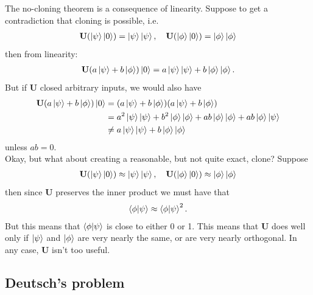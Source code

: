 \documentclass{book}
\theoremstyle{definition}
\newcommand{\nn}{\nonumber}
\begin{document}
The no-cloning theorem is a consequence of linearity. Suppose to get a contradiction that cloning is possible, i.e. 
\begin{align}
\mathbf{U}(\ket{\psi}\ket{0}) = \ket{\psi}\ket{\psi}, \quad \mathbf{U}(\ket{\phi}\ket{0}) = \ket{\phi}\ket{\phi}
\end{align}
then from linearity:
\begin{align}
\mathbf{U}(a\ket{\psi} + b\ket{\phi})\ket{0} = a\ket{\psi}\ket{\psi} + b\ket{\phi}\ket{\phi}.
\end{align}
But if $\mathbf{U}$ closed arbitrary inputs, we would also have
\begin{align}
\mathbf{U}(a\ket{\psi} + b\ket{\phi})\ket{0} &= (a\ket{\psi} + b\ket{\phi})(a\ket{\psi} + b\ket{\phi})\nn\\
&= a^2\ket{\psi}\ket{\psi} + b^2\ket{\phi}\ket{\phi} + ab\ket{\phi}\ket{\phi} + ab\ket{\phi}\ket{\psi}\nn\\
&\neq a\ket{\psi}\ket{\psi} + b\ket{\phi}\ket{\phi}
\end{align}
unless $ab=0$. \\

Okay, but what about creating a reasonable, but not quite exact, clone? Suppose
\begin{align}
\mathbf{U}(\ket{\psi}\ket{0}) \approx \ket{\psi}\ket{\psi}, \quad \mathbf{U}(\ket{\phi}\ket{0}) \approx \ket{\phi}\ket{\phi}
\end{align}
then since $\mathbf{U}$ preserves the inner product we must have that
\begin{align}
\braket{\phi}{\psi} \approx \braket{\phi}{\psi}^2.
\end{align}
But this means that $\braket{\phi}{\psi}$ is close to either 0 or 1. This means that $\mathbf{U}$ does well only if $\ket{\psi}$ and $\ket{\phi}$ are very nearly the same, or are very nearly orthogonal. In any case, $\mathbf{U}$ isn't too useful. 








\subsection{Deutsch's problem}
\end{document}
